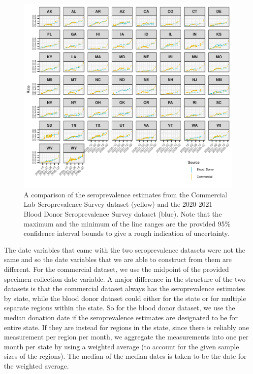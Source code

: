 \documentclass{article}
\begin{document}
\begin{figure}[!tb]
\centering
    \includegraphics[width=.99\textwidth]{sero_blood_comm_compar.pdf}
    \caption{A comparison of the seroprevalence estimates from the Commercial Lab Seroprevalence Survey dataset (yellow) and the 2020-2021 Blood Donor Seroprevalence Survey dataset (blue). Note that the maximum and the minimum of the line ranges are the provided 95\% confidence interval bounds to give a rough indication of uncertainty.}
    \label{fig:sero_blood_comm_compar}
\end{figure}

The date variables that came with the two seroprevalence datasets were not the same and so the date variables that we are able to construct from them are different. For the commercial dataset, we use the midpoint of the provided specimen collection date variable. A major difference in the structure of the two datasets is that the commercial dataset always has the seroprevalence estimates by state, while the blood donor dataset could either for the state or for multiple separate regions within the state. So for the blood donor dataset, we use the median donation date if the seroprevalence estimates are designated to be for entire state. If they are instead for regions in the state, since there is reliably one measurement per region per month, we aggregate the measurements into one per month per state by using a weighted average (to account for the given sample sizes of the regions). The median of the median dates is taken to be the date for the weighted average.
\end{document}
